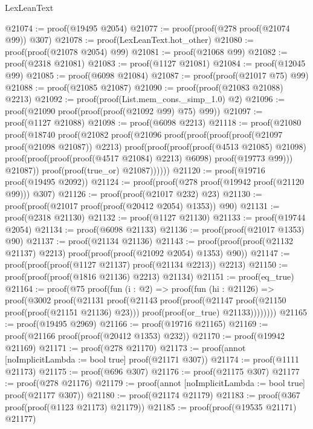 \begin{lexlean}{LexLeanText}
\begin{coremodule}
@21074 := proof(@19495 @2054)
@21077 := proof(proof(@278 proof(@21074 @99)) @307)
@21078 := proof(LexLeanText.hot_other)
@21080 := proof(proof(@21078 @2054) @99)
@21081 := proof(@21068 @99)
@21082 := proof(@2318 @21081)
@21083 := proof(@1127 @21081)
@21084 := proof(@12045 @99)
@21085 := proof(@6098 @21084)
@21087 := proof(proof(@21017 @75) @99)
@21088 := proof(@21085 @21087)
@21090 := proof(proof(@21083 @21088) @2213)
@21092 := proof(proof(List.mem_cons._simp_1.{0}) @2)
@21096 := proof(@21090 proof(proof(proof(@21092 @99) @75) @99))
@21097 := proof(@1127 @21088)
@21098 := proof(@6098 @2213)
@21118 := proof(@21080
      proof(@18740
          proof(@21082
              proof(@21096
                  proof(proof(proof(proof(@21097 proof(@21098 @21087)) @2213)
                        proof(proof(proof(proof(@4513 @21085) @21098)
                              proof(proof(proof(proof(@4517 @21084) @2213) @6098)
                                  proof(@19773 @99)))
                            @21087))
                      proof(proof(true_or) @21087))))))
@21120 := proof(@19716 proof(@19495 @2092))
@21124 := proof(proof(@278 proof(@19942 proof(@21120 @99))) @307)
@21126 := proof(proof(@21017 @232) @23)
@21130 := proof(proof(@21017 proof(proof(@20412 @2054) @1353)) @90)
@21131 := proof(@2318 @21130)
@21132 := proof(@1127 @21130)
@21133 := proof(@19744 @2054)
@21134 := proof(@6098 @21133)
@21136 := proof(proof(@21017 @1353) @90)
@21137 := proof(@21134 @21136)
@21143 := proof(proof(proof(@21132 @21137) @2213) proof(proof(proof(@21092 @2054) @1353) @90))
@21147 := proof(proof(proof(@1127 @21137) proof(@21134 @2213)) @2213)
@21150 := proof(proof(proof(@1816 @21136) @2213) @21134)
@21151 := proof(eq_true)
@21164 := proof(@75
      proof(fun (i : @2) =>
        proof(fun (hi : @21126) =>
          proof(@3002
              proof(@21131
                  proof(@21143
                      proof(proof(@21147 proof(@21150 proof(proof(@21151 @21136) @23)))
                          proof(proof(or_true) @21133))))))))
@21165 := proof(@19495 @2969)
@21166 := proof(@19716 @21165)
@21169 := proof(@21166 proof(proof(@20412 @1353) @232))
@21170 := proof(@19942 @21169)
@21171 := proof(@278 @21170)
@21173 := proof(annot [noImplicitLambda := bool true] proof(@21171 @307))
@21174 := proof(@1111 @21173)
@21175 := proof(@696 @307)
@21176 := proof(@21175 @307)
@21177 := proof(@278 @21176)
@21179 := proof(annot [noImplicitLambda := bool true] proof(@21177 @307))
@21180 := proof(@21174 @21179)
@21183 := proof(@367 proof(proof(@1123 @21173) @21179))
@21185 := proof(proof(@19535 @21171) @21177)

\end{coremodule}
\end{lexlean}
